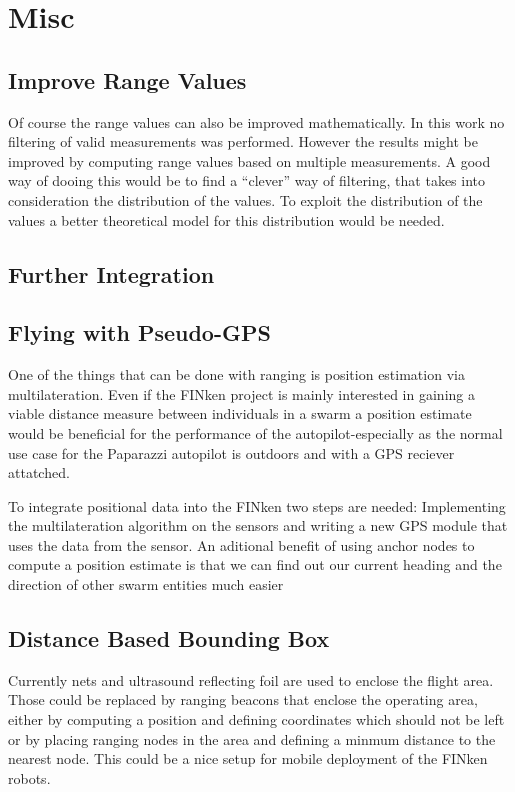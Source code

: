 \section{Misc}

\subsection{Improve Range Values}

Of course the range values can also be improved mathematically.
In this work no filtering of valid measurements was performed.
However the results might be improved by computing range values based on multiple measurements.
A good way of dooing this would be to find a “clever” way of filtering, that takes into consideration the distribution of the values.
To exploit the distribution of the values a better theoretical model for this distribution would be needed.


\subsection{Further Integration}


\subsection{Flying with Pseudo-GPS}
One of the things that can be done with ranging is position estimation via multilateration.
Even if the FINken project is mainly interested in gaining a viable distance measure between individuals in a swarm a position estimate would be beneficial for the performance of the autopilot-especially as the normal use case for the Paparazzi autopilot is outdoors and with a GPS reciever attatched.

To integrate positional data into the FINken two steps are needed: Implementing the multilateration algorithm on the sensors and writing a new GPS module that uses the data from the sensor.
An aditional benefit of using anchor nodes to compute a position estimate is that we can find out our current heading and the direction of other swarm entities much easier

\subsection{Distance Based Bounding Box}
Currently nets and ultrasound reflecting foil are used to enclose the flight area.
Those could be replaced by ranging beacons that enclose the operating area, either by computing a position and defining coordinates which should not be left or by placing ranging nodes in the area and defining a minmum distance to the nearest node.
This could be a nice setup for mobile deployment of the FINken robots.


